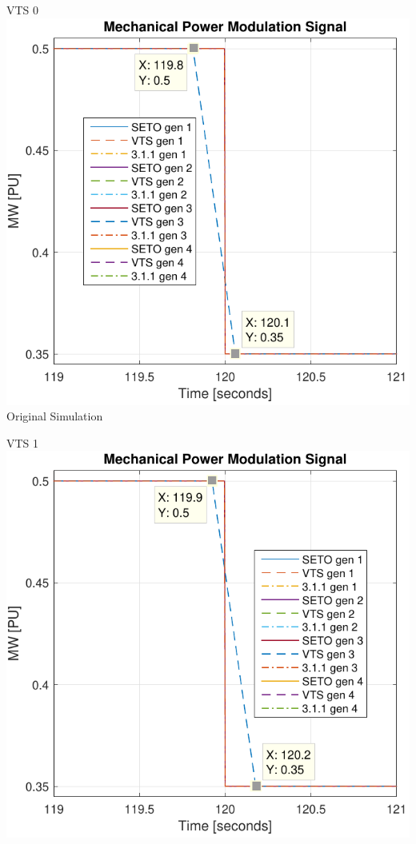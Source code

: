 \documentclass[12pt]{article}
\begin{document}
\begin{center}
\centering
\begin{minipage}{.3\linewidth}
\centering
VTS 0
\includegraphics[width=\linewidth]{pmSig_0}
Original Simulation
\end{minipage} %
\begin{minipage}{.3\linewidth}
\centering
VTS 1
\includegraphics[width=\linewidth]{pmSig_1}

\end{minipage}
\end{center}
\end{document}
